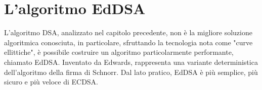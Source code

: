 \chapter{L'algoritmo EdDSA}


L'algoritmo DSA, analizzato nel capitolo precedente, non è la migliore soluzione algoritmica conosciuta, in particolare, sfruttando la tecnologia nota come "curve ellittiche", è possibile costruire un algoritmo particolarmente performante, chiamato EdDSA.
Inventato da Edwards, rappresenta una variante deterministica dell'algoritmo della firma di Schnorr. Dal lato pratico, EdDSA è più semplice, più sicuro e più veloce di ECDSA.
